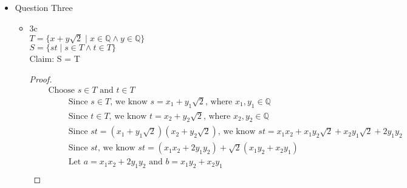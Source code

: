 \documentclass{article}
\begin{document}
\begin{itemize}
\begin{itemize}
\begin{proof}
\begin{align}
                &\quad \text{In either case of } H \cup (J \cap K) \text{, we proved that } x \in (H \cup K) \setminus M \\
                &\quad \text{Under the assumption of } J \subseteq L \setminus M \text{ and } H \subseteq \overline{M}, \\
                &\quad \hspace{0.5cm} \text{we proved that any member of } H \cup (J \cap K) \text{ is a member of } (H \cup K) \setminus M, \nonumber \\
                &\quad \hspace{0.5cm} \text{therefore } H \cup (J \cap K) \subseteq (H \cup K) \setminus M \nonumber
            \end{align}
        \end{proof}
    \end{itemize}
    \item Question Three
    \begin{itemize}
        \item 3c \\
        $T = \{x+y \sqrt{2} \mid x \in \mathbb{Q} \land y \in \mathbb{Q} \}$ \\
        $S = \{st \mid s \in T \land t \in T \}$ \\
        Claim: S = T
        \begin{proof}
            \begin{align}
                &\quad \text{Choose } s \in T \text{ and } t \in T \\
                &\quad \hspace{1cm} \text{Since } s \in T \text{, we know } s = x_1 + y_1 \sqrt{2} \text{, where } x_1,y_1 \in \mathbb{Q} \\
                &\quad \hspace{1cm} \text{Since } t \in T \text{, we know } t = x_2 + y_2 \sqrt{2} \text{, where } x_2,y_2 \in \mathbb{Q} \\
                &\quad \hspace{1cm} \text{Since } st = (x_1 + y_1 \sqrt{2})(x_2 + y_2 \sqrt{2}) \text{, we know } st = x_1x_2 + x_1y_2 \sqrt{2} + x_2y_1 \sqrt{2} + 2y_1y_2 \\
                &\quad \hspace{1cm} \text{Since } st \text{, we know } st = (x_1x_2 + 2y_1y_2) + \sqrt{2}(x_1y_2 + x_2y_1) \\
                &\quad \hspace{1cm} \text{Let } a = x_1x_2 + 2y_1y_2 \text{ and } b = x_1y_2 + x_2y_1 \\

\end{align}
\end{proof}
\end{itemize}
\end{itemize}
\end{document}
